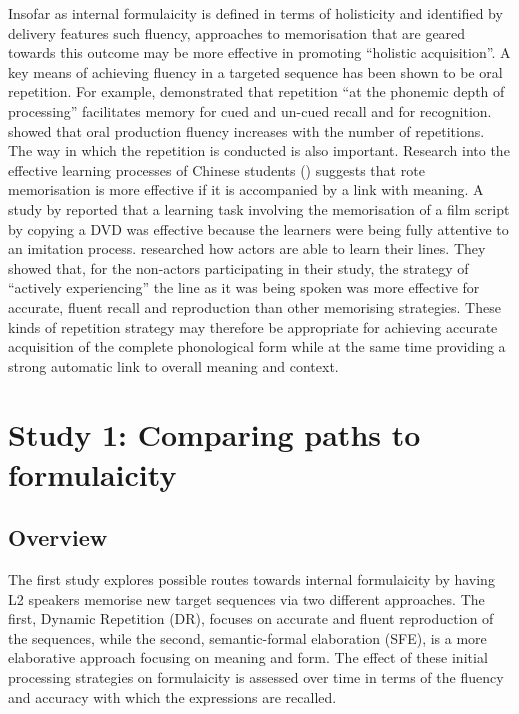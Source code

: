 \documentclass[output=paper]{langscibook}
\begin{document}
Insofar as internal formulaicity is defined in terms of holisticity and identified by delivery features such fluency, approaches to memorisation that are geared towards this outcome may be more effective in promoting ``holistic acquisition''. A key means of achieving fluency in a targeted sequence has been shown to be oral repetition. For example, \citet{Nelson1977} demonstrated that repetition “at the phonemic depth of processing” facilitates memory for cued and un-cued recall and for recognition. \citet{YoshimuraMacWhinney2007} showed that oral production fluency increases with the number of repetitions. The way in which the repetition is conducted is also important. Research into the effective learning processes of Chinese students (\citealt{AuEntwhistle1999}) suggests that rote memorisation is more effective if it is accompanied by a link with meaning. A study by \citet{Ding2007} reported that a learning task involving the memorisation of a film script by copying a DVD was effective because the learners were being fully attentive to an imitation process. \citet{NoiceNoice2006} researched how actors are able to learn their lines. They showed that, for the non-actors participating in their study, the strategy of ``actively experiencing'' the line as it was being spoken was more effective for accurate, fluent recall and reproduction than other memorising strategies. These kinds of repetition strategy may therefore be appropriate for achieving accurate acquisition of the complete phonological form while at the same time providing a strong automatic link to overall meaning and context. 

\section{Study 1: Comparing paths to formulaicity}
\subsection{Overview} 

The first study explores possible routes towards internal formulaicity by having L2 speakers memorise new target sequences via two different approaches. The first, Dynamic Repetition (DR), focuses on accurate and fluent reproduction of the sequences, while the second, semantic-formal elaboration (SFE), is a more elaborative approach focusing on meaning and form. The effect of these initial processing strategies on formulaicity is assessed over time in terms of the fluency and accuracy with which the expressions are recalled. 
\end{document}
